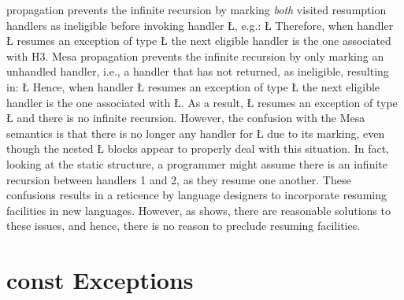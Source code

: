 \documentclass[openright,twoside]{report}
\begin{document}
\uC propagation prevents the infinite recursion by marking \emph{both} visited resumption handlers as ineligible before invoking handler \LGinlinetrue\LGbegin\lgrinde\L{}\endlgrinde\LGend{}, e.g.:
\LGinlinefalse\LGbegin\lgrinde
\L{}
\endlgrinde\LGend
Therefore, when handler \LGinlinetrue\LGbegin\lgrinde\L{}\endlgrinde\LGend{} resumes an exception of type \LGinlinetrue\LGbegin\lgrinde\L{}\endlgrinde\LGend{} the next eligible handler is the one associated with H3.
Mesa propagation prevents the infinite recursion by only marking an unhandled handler, i.e., a handler that has not returned, as ineligible, resulting in:
\LGinlinefalse\LGbegin\lgrinde
\L{}
\endlgrinde\LGend
Hence, when handler \LGinlinetrue\LGbegin\lgrinde\L{}\endlgrinde\LGend{} resumes an exception of type \LGinlinetrue\LGbegin\lgrinde\L{}\endlgrinde\LGend{} the next eligible handler is the one associated with \LGinlinetrue\LGbegin\lgrinde\L{}\endlgrinde\LGend{}.
As a result, \LGinlinetrue\LGbegin\lgrinde\L{}\endlgrinde\LGend{} resumes an exception of type \LGinlinetrue\LGbegin\lgrinde\L{}\endlgrinde\LGend{} and there is no infinite recursion.
However, the confusion with the Mesa semantics is that there is no longer any handler for \LGinlinetrue\LGbegin\lgrinde\L{}\endlgrinde\LGend{} due to its marking, even though the nested \LGinlinetrue\LGbegin\lgrinde\L{}\endlgrinde\LGend{} blocks appear to properly deal with this situation.
In fact, looking at the static structure, a programmer might assume there is an infinite recursion between handlers 1 and 2, as they resume one another.
These confusions results in a reticence by language designers to incorporate resuming facilities in new languages.
However, as \uC shows, there are reasonable solutions to these issues, and hence, there is no reason to preclude resuming facilities.


\section{{\KWfont const} Exceptions}
\label{s:constExceptions}
\end{document}
